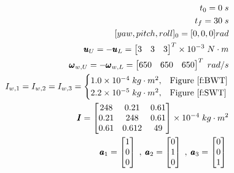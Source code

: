\documentclass[letterpaper, paper,11pt]{AAS}
\begin{document}
\begin{align*}
t_{0} = 0 \; s  \\
t_{f} = 30 \; s \\
\lbrack yaw, pitch, roll\rbrack_{0} = \lbrack 0, 0, 0\rbrack rad \\
\pmb{u}_{U} = -\pmb{u}_{L} = \begin{bmatrix}3 & 3 & 3 \end{bmatrix}^{T} \times 10^{-3} \; N \cdot  m \\
\pmb{\omega}_{w,U} = -\pmb{\omega}_{w,L} = \begin{bmatrix} 650 & 650& 650 \end{bmatrix}^{T} \; rad/s \\
I_{w,1} = I_{w,2} = I_{w,3} = 
\begin{cases}
1.0 \times 10^{-4} \; kg \cdot m^2, & \text{Figure \ref{f:BWT}} \\
2.2 \times 10^{-5} \; kg \cdot m^2, & \text{Figure \ref{f:SWT}}
\end{cases} \\
\pmb{I} = \begin{bmatrix}
248 & 0.21 & 0.61 \\
0.21 & 248 & 0.61 \\
0.61 & 0.61 2 & 49 \\
\end{bmatrix} \times 10^{-4} \; kg \cdot m^{2}\\
\pmb{a}_1 = \begin{bmatrix}
1 \\ 0 \\ 0
\end{bmatrix} \; , \;
\pmb{a}_2 = \begin{bmatrix}
0 \\ 1 \\ 0
\end{bmatrix} \; , \;
\pmb{a}_3 = \begin{bmatrix}
0 \\ 0 \\ 1
\end{bmatrix} \;
\end{align*}


\end{document}
